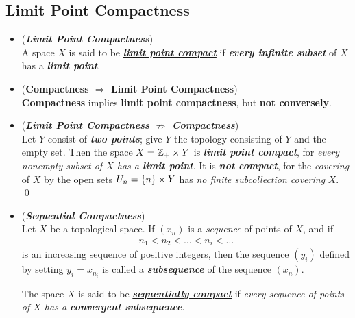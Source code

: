 \documentclass[11pt]{article}
\begin{document}
\subsection{Limit Point Compactness}
\begin{itemize}
\item \begin{definition} (\emph{\textbf{Limit Point Compactness}})\\
A space $X$ is said to be \underline{\emph{\textbf{limit point compact}}} if \emph\textbf{{every infinite subset}} of $X$ has a \emph{\textbf{limit point}}.
\end{definition}

\item \begin{proposition}(\textbf{Compactness $\Rightarrow$ Limit Point Compactness}) \citep{munkres2000topology}\\
\textbf{Compactness} implies \textbf{limit point compactness}, but \textbf{not conversely}.
\end{proposition}

\item \begin{example}(\textbf{\emph{Limit Point Compactness $\not\Rightarrow$ Compactness}}) \\
Let $Y$ consist of \emph{\textbf{two points}}; give $Y$ the topology consisting of $Y$ and the empty set. Then the space $X = {\mathbb Z}_{+} \times Y$ is \textbf{\emph{limit point compact}}, for \emph{every nonempty subset of $X$ has a \textbf{limit point}}. It is \emph{\textbf{not compact}}, for the \emph{covering} of $X$ by the open sets $U_n = \left\{n\right\} \times Y$ has \emph{no finite subcollection covering} $X$. \qed
\end{example}

\item \begin{definition} (\emph{\textbf{Sequential Compactness}})\\
Let $X$ be a topological space. If $(x_n)$ is a \emph{sequence} of points of $X$, and if
\begin{align*}
n_1 < n_2 < \ldots < n_i < \ldots
\end{align*}
is an increasing sequence of positive integers, then the sequence $(y_i)$ defined by setting $y_i = x_{n_i}$ is called a \emph{\textbf{subsequence}} of the sequence $(x_n)$. 

The space $X$ is said to be \underline{\emph{\textbf{sequentially compact}}} if \emph{every sequence of points of $X$ has a \textbf{convergent subsequence}}.
\end{definition}


\end{itemize}
\end{document}
